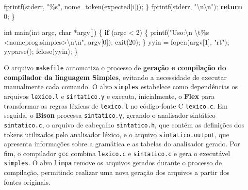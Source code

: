 \documentclass[
  brazilian,
  letterpaper,
]{book}
\newenvironment{Shaded}{\begin{snugshade}}{\end{snugshade}}
\newcommand{\ControlFlowTok}[1]{\textcolor[rgb]{0.00,0.23,0.31}{\textbf{#1}}}
\newcommand{\DataTypeTok}[1]{\textcolor[rgb]{0.68,0.00,0.00}{#1}}
\newcommand{\DecValTok}[1]{\textcolor[rgb]{0.68,0.00,0.00}{#1}}
\newcommand{\NormalTok}[1]{\textcolor[rgb]{0.00,0.23,0.31}{#1}}
\newcommand{\OperatorTok}[1]{\textcolor[rgb]{0.37,0.37,0.37}{#1}}
\newcommand{\SpecialCharTok}[1]{\textcolor[rgb]{0.37,0.37,0.37}{#1}}
\newcommand{\StringTok}[1]{\textcolor[rgb]{0.13,0.47,0.30}{#1}}
\theoremstyle{plain}
\theoremstyle{definition}
\theoremstyle{remark}
\begin{document}
\begin{Shaded}
\begin{Highlighting}[]
\NormalTok{        fprintf}\OperatorTok{(}\NormalTok{stderr}\OperatorTok{,} \StringTok{"}\SpecialCharTok{\%s}\StringTok{"}\OperatorTok{,}\NormalTok{ nome\_token}\OperatorTok{(}\NormalTok{expected}\OperatorTok{[}\NormalTok{i}\OperatorTok{]));}
    \OperatorTok{\}}
\NormalTok{    fprintf}\OperatorTok{(}\NormalTok{stderr}\OperatorTok{,} \StringTok{"}\SpecialCharTok{\textbackslash{}n\textbackslash{}n}\StringTok{"}\OperatorTok{);}
    \ControlFlowTok{return} \DecValTok{0}\OperatorTok{;}
\OperatorTok{\}}

\DataTypeTok{int}\NormalTok{ main}\OperatorTok{(}\DataTypeTok{int}\NormalTok{ argc}\OperatorTok{,} \DataTypeTok{char} \OperatorTok{*}\NormalTok{argv}\OperatorTok{[])} \OperatorTok{\{}
    \ControlFlowTok{if} \OperatorTok{(}\NormalTok{argc }\OperatorTok{\textless{}} \DecValTok{2}\OperatorTok{)} \OperatorTok{\{}
\NormalTok{        printf}\OperatorTok{(}\StringTok{"Uso:}\SpecialCharTok{\textbackslash{}n}\StringTok{ }\SpecialCharTok{\textbackslash{}t\%s}\StringTok{ \textless{}nomeprog.simples\textgreater{}}\SpecialCharTok{\textbackslash{}n\textbackslash{}n}\StringTok{"}\OperatorTok{,}\NormalTok{ argv}\OperatorTok{[}\DecValTok{0}\OperatorTok{]);}
\NormalTok{        exit}\OperatorTok{(}\DecValTok{20}\OperatorTok{);}
    \OperatorTok{\}}
\NormalTok{    yyin }\OperatorTok{=}\NormalTok{ fopen}\OperatorTok{(}\NormalTok{argv}\OperatorTok{[}\DecValTok{1}\OperatorTok{],} \StringTok{"rt"}\OperatorTok{);}
\NormalTok{    yyparse}\OperatorTok{();}
\NormalTok{    fclose}\OperatorTok{(}\NormalTok{yyin}\OperatorTok{);}
\OperatorTok{\}}
\end{Highlighting}
\end{Shaded}

O arquivo \texttt{makefile} automatiza o processo de \textbf{geração e
compilação do compilador da linguagem Simples}, evitando a necessidade
de executar manualmente cada comando. O alvo \texttt{simples} estabelece
como dependências os arquivos \texttt{lexico.l} e \texttt{sintatico.y} e
executa, inicialmente, o \textbf{Flex} para transformar as regras
léxicas de \texttt{lexico.l} no código-fonte C \texttt{lexico.c}. Em
seguida, o \textbf{Bison} processa \texttt{sintatico.y}, gerando o
analisador sintático \texttt{sintatico.c}, o arquivo de cabeçalho
\texttt{sintatico.h}, que contém as definições dos tokens utilizados
pelo analisador léxico, e o arquivo \texttt{sintatico.output}, que
apresenta informações sobre a gramática e as tabelas do analisador
gerado. Por fim, o compilador \texttt{gcc} combina \texttt{lexico.c} e
\texttt{sintatico.c} e gera o executável \texttt{simples}. O alvo
\texttt{limpa} remove os arquivos gerados durante o processo de
compilação, permitindo realizar uma nova geração dos arquivos a partir
dos fontes originais.
\end{document}
